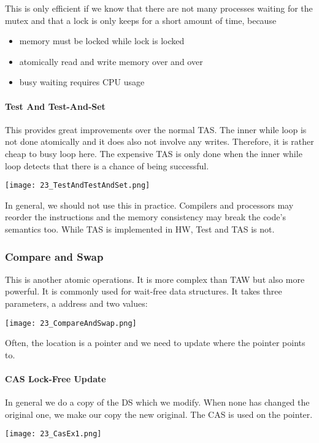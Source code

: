 This is only efficient if we know that there are not many processes waiting for the mutex and that a lock is only keeps for a short amount of time, because

\begin{itemize}
    \item memory must be locked while lock is locked
    \item atomically read and write memory over and over
    \item busy waiting requires CPU usage
\end{itemize}

\paragraph{Test And Test-And-Set}
This provides great improvements over the normal TAS. The inner while loop is not done atomically and it does also not involve any writes. Therefore, it is rather cheap to busy loop here. The expensive TAS is only done when the inner while loop detects that there is a chance of being successful.

\texttt{[image: 23\_TestAndTestAndSet.png]}

In general, we should not use this in practice. Compilers and processors may reorder the instructions and the memory consistency may break the code's semantics too. While TAS is implemented in HW, Test and TAS is not.

\subsubsection{Compare and Swap}
This is another atomic operations. It is more complex than TAW but also more powerful. It is commonly used for wait-free data structures. It takes three parameters, a address and two values:

\texttt{[image: 23\_CompareAndSwap.png]}

Often, the location is a pointer and we need to update where the pointer points to.

\paragraph{CAS Lock-Free Update}
In general we do a copy of the DS which we modify. When none has changed the original one, we make our copy the new original. The CAS is used on the pointer.

\texttt{[image: 23\_CasEx1.png]}

